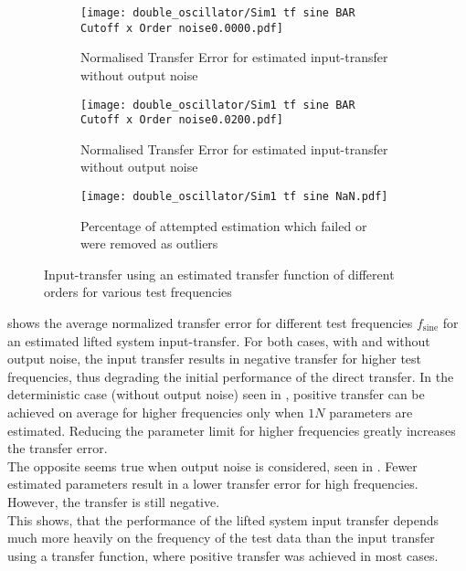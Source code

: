 \begin{figure}
    \centering
    \begin{subfigure}[t]{1\textwidth}
        \centering
        \texttt{[image: double\_oscillator/Sim1 tf sine BAR Cutoff x Order noise0.0000.pdf]}
        \caption{Normalised Transfer Error for estimated input-transfer without output noise}
        \label{subfig:sim1_sine_det}
    \end{subfigure}
    \hfill
    \begin{subfigure}[t]{1\textwidth}
        \centering
        \texttt{[image: double\_oscillator/Sim1 tf sine BAR Cutoff x Order noise0.0200.pdf]}
        \caption{Normalised Transfer Error for estimated input-transfer without output noise}
        \label{subfig:sim1_sine_noise}
    \end{subfigure}
    \hfill
    \begin{subfigure}[t]{1\textwidth}
        \centering
        \texttt{[image: double\_oscillator/Sim1 tf sine NaN.pdf]}
        \caption{Percentage of attempted estimation which failed or were removed as outliers}
        \label{subfig:sim1_sine_failes}
    \end{subfigure}
    \caption[Double Oscillator -- Results for Sinusoidal Test Inputs (Transfer Function)]{Input-transfer using an estimated transfer function of different orders for various test frequencies}
    \label{fig:sim1_sine_results}
\end{figure}

 shows the average normalized transfer error for different test frequencies $f_{\mathrm{sine}}$ for an estimated lifted system input-transfer. For both cases, with and without output noise, the input transfer results in negative transfer for higher test frequencies, thus degrading the initial performance of the direct transfer. In the deterministic case (without output noise) seen in , positive transfer can be achieved on average for higher frequencies only when $1N$ parameters are estimated. 
Reducing the parameter limit for higher frequencies greatly increases the transfer error.\\
The opposite seems true when output noise is considered, seen in . Fewer estimated parameters result in a lower transfer error for high frequencies. However, the transfer is still negative.\\ 
This shows, that the performance of the lifted system input transfer depends much more heavily on the frequency of the test data than the input transfer using a transfer function, where positive transfer was achieved in most cases. 

